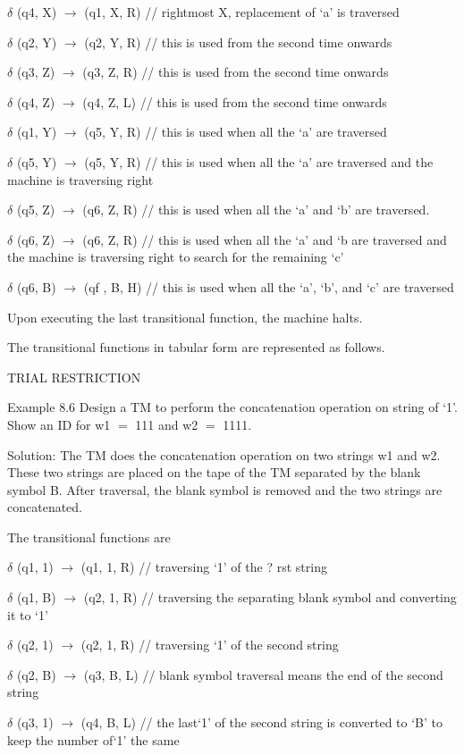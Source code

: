 \documentclass{article}
\begin{document}
$\delta $ (q4, X) $\to $ (q1, X, R) // rightmost X, replacement of `a' is
traversed

$\delta $ (q2, Y) $\to $ (q2, Y, R) // this is used from the second time
onwards

$\delta $ (q3, Z) $\to $ (q3, Z, R) // this is used from the second time
onwards

$\delta $ (q4, Z) $\to $ (q4, Z, L) // this is used from the second time
onwards

$\delta $ (q1, Y) $\to $ (q5, Y, R) // this is used when all the `a' are
traversed

$\delta $ (q5, Y) $\to $ (q5, Y, R) // this is used when all the `a' are
traversed and the machine is traversing right

$\delta $ (q5, Z) $\to $ (q6, Z, R) // this is used when all the `a' and `b'
are traversed.

$\delta $ (q6, Z) $\to $ (q6, Z, R) // this is used when all the `a' and `b
are traversed and the machine is traversing right to search for the
remaining `c'

$\delta $ (q6, B) $\to $ (qf , B, H) // this is used when all the `a', `b',
and `c' are traversed

Upon executing the last transitional function, the machine halts.

The transitional functions in tabular form are represented as follows.

TRIAL RESTRICTION

Example 8.6 Design a TM to perform the concatenation operation on string of
`1'. Show an ID for w1 $=$ 111 and w2 $=$ 1111.

Solution: The TM does the concatenation operation on two strings w1 and w2.
These two strings are placed on the tape of the TM separated by the blank
symbol B. After traversal, the blank symbol is removed and the two strings
are concatenated.

The transitional functions are

$\delta $ (q1, 1) $\to $ (q1, 1, R) // traversing `1' of the ? rst string

$\delta $ (q1, B) $\to $ (q2, 1, R) // traversing the separating blank symbol
and converting it to `1'

$\delta $ (q2, 1) $\to $ (q2, 1, R) // traversing `1' of the second string

$\delta $ (q2, B) $\to $ (q3, B, L) // blank symbol traversal means the end of
the second string

$\delta $ (q3, 1) $\to $ (q4, B, L) // the last`1' of the second string is
converted to `B' to keep the number of`1' the same
\end{document}
